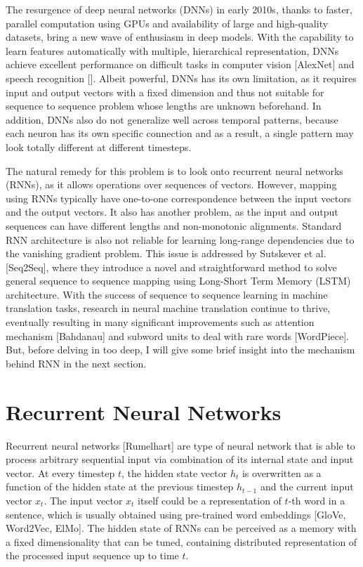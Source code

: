 \documentclass[12pt]{extarticle}
\begin{document}
The resurgence of deep neural networks (DNNs) in early 2010s, thanks to faster, parallel computation using GPUs and availability of large and high-quality datasets, bring a new wave of enthusiasm in deep models. With the capability to learn features automatically with multiple, hierarchical representation, DNNs achieve excellent performance on difficult tasks in computer vision [AlexNet] and speech recognition []. Albeit powerful, DNNs has its own limitation, as it requires input and output vectors with a fixed dimension and thus not suitable for sequence to sequence problem whose lengths are unknown beforehand. In addition, DNNs also do not generalize well across temporal patterns, because each neuron has its own specific connection and as a result, a single pattern may look totally different at different timesteps.

The natural remedy for this problem is to look onto recurrent neural networks (RNNs), as it allows operations over sequences of vectors. However, mapping using RNNs typically have one-to-one correspondence between the input vectors and the output vectors. It also has another problem, as the input and output sequences can have different lengths and non-monotonic alignments. Standard RNN architecture is also not reliable for learning long-range dependencies due to the vanishing gradient problem. This issue is addressed by Sutskever et al. [Seq2Seq], where they introduce a novel and straightforward method to solve general sequence to sequence mapping using Long-Short Term Memory (LSTM) architecture. With the success of sequence to sequence learning in machine translation tasks, research in neural machine translation continue to thrive, eventually resulting in many significant improvements such as attention mechanism [Bahdanau] and subword units to deal with rare words [WordPiece]. But, before delving in too deep, I will give some brief insight into the mechanism behind RNN in the next section. 



 

\section*{Recurrent Neural Networks} %

Recurrent neural networks [Rumelhart] are type of neural network that is able to process arbitrary sequential input via combination of its internal state and input vector. At every timestep $t$, the hidden state vector $h_{t}$ is overwritten as a function of the hidden state at the previous timestep $h_{t-1}$ and the current input vector $x_{t}$. The input vector $x_{t}$ itself could be a representation of $t$-th word in a sentence, which is usually obtained using pre-trained word embeddings [GloVe, Word2Vec, ElMo]. The hidden state of RNNs can be perceived as a memory with a fixed dimensionality that can be tuned, containing distributed representation of the processed input sequence up to time $t$.
\end{document}
